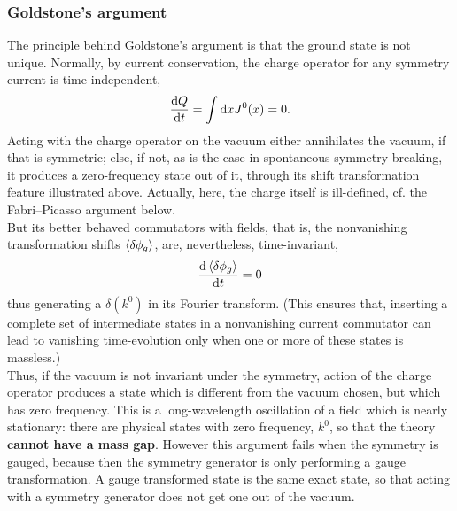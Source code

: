 \subsubsection{Goldstone's argument}
The principle behind Goldstone's argument is that the ground state is not unique. Normally, by current conservation, the charge operator for any symmetry current is time-independent,
\begin{equation}
\frac{\mathrm{d} Q}{\mathrm{d} t} = \int \mathrm{d} x J^0(x) = 0.
\end{equation}
Acting with the charge operator on the vacuum either annihilates the vacuum, if that is symmetric; else, if not, as is the case in spontaneous symmetry breaking, it produces a zero-frequency state out of it, through its shift transformation feature illustrated above. Actually, here, the charge itself is ill-defined, cf. the Fabri–Picasso argument below.\\
But its better behaved commutators with fields, that is, the nonvanishing transformation shifts $\expval{\delta \phi_g}$, are, nevertheless, time-invariant,
\begin{equation}
\frac{\mathrm{d} \expval{\delta \phi_g}}{\mathrm{d} t} = 0
\end{equation}
thus generating a $\delta(k^0)$ in its Fourier transform. (This ensures that, inserting a complete set of intermediate states in a nonvanishing current commutator can lead to vanishing time-evolution only when one or more of these states is massless.)\\
Thus, if the vacuum is not invariant under the symmetry, action of the charge operator produces a state which is different from the vacuum chosen, but which has zero frequency. This is a long-wavelength oscillation of a field which is nearly stationary: there are physical states with zero frequency, $k^0$, so that the theory \textbf{cannot have a mass gap}. However this argument fails when the symmetry is gauged, because then the symmetry generator is only performing a gauge transformation. A gauge transformed state is the same exact state, so that acting with a symmetry generator does not get one out of the vacuum.
